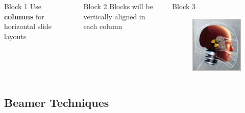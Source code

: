 \documentclass{beamer}
\begin{document}
\begin{frame}
    \begin{columns}[t]
        \begin{block}{Block 1}
            Use \textbf{columns} for horizontal slide layouts
        \end{block}
        \begin{block}{Block 2}
            Blocks will be vertically aligned in each column
        \end{block}
        \begin{block}{Block 3}
            \begin{figure} 
                \centering 
                \includegraphics[width=\linewidth]{images/dummy}
            \end{figure}
        \end{block}
    \end{columns}
\end{frame}

\subsection{Beamer Techniques}
\end{document}
